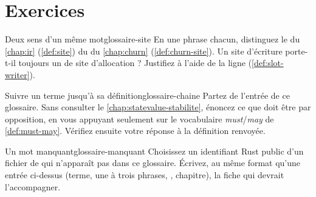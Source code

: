 \section{Exercices}
\label{sec:glossaire-exercices}

\begin{exercice}{Deux sens d'un même mot}{glossaire-site}
En une phrase chacun, distinguez le  du \cref{chap:ir} (\cref{def:site}) du  du \cref{chap:churn} (\cref{def:churn-site}). Un site d'écriture porte-t-il toujours un  de site d'allocation ? Justifiez à l'aide de la ligne  (\cref{def:slot-writer}).
\end{exercice}

\begin{exercice}{Suivre un terme jusqu'à sa définition}{glossaire-chaine}
Partez de l'entrée \og {}\fg{} de ce glossaire. Sans consulter le \cref{chap:statevalue-stabilite}, énoncez ce que doit être  par opposition, en vous appuyant seulement sur le vocabulaire \emph{must}/\emph{may} de \cref{def:must-may}. Vérifiez ensuite votre réponse à la définition renvoyée.
\end{exercice}

\begin{exercice}{Un mot manquant}{glossaire-manquant}
Choisissez un identifiant Rust public d'un fichier de  qui n'apparaît pas dans ce glossaire. Écrivez, au même format qu'une entrée ci-dessus (terme, une à trois phrases, , chapitre), la fiche qui devrait l'accompagner.
\end{exercice}
